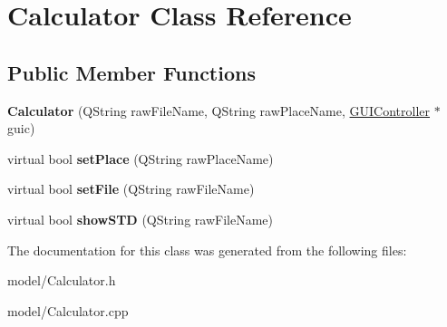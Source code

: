 \hypertarget{classCalculator}{\section{Calculator Class Reference}
\label{classCalculator}
}
\subsection*{Public Member Functions}
\begin{DoxyCompactItemize}
\item 
\hypertarget{classCalculator_a824ab5b5f701d31a1300e6dcee9ef5c4}{{\bfseries Calculator} (Q\-String raw\-File\-Name, Q\-String raw\-Place\-Name, \hyperlink{classGUIController}{G\-U\-I\-Controller} $\ast$guic)}\label{classCalculator_a824ab5b5f701d31a1300e6dcee9ef5c4}

\item 
\hypertarget{classCalculator_a6a6894287322ae2b651224ffe180d648}{virtual bool {\bfseries set\-Place} (Q\-String raw\-Place\-Name)}\label{classCalculator_a6a6894287322ae2b651224ffe180d648}

\item 
\hypertarget{classCalculator_a832e1f4bffc5758d934e391ec733ffbc}{virtual bool {\bfseries set\-File} (Q\-String raw\-File\-Name)}\label{classCalculator_a832e1f4bffc5758d934e391ec733ffbc}

\item 
\hypertarget{classCalculator_a89c07091640287ae63320233179b9e41}{virtual bool {\bfseries show\-S\-T\-D} (Q\-String raw\-File\-Name)}\label{classCalculator_a89c07091640287ae63320233179b9e41}

\end{DoxyCompactItemize}


The documentation for this class was generated from the following files\-:\begin{DoxyCompactItemize}
\item 
model/Calculator.\-h\item 
model/Calculator.\-cpp\end{DoxyCompactItemize}
